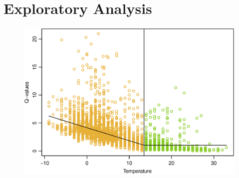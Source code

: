 \chapter{Exploratory Analysis}


\begin{figure}[H]
    \centering \includegraphics[width=1.\textwidth]{../../../figures/Consumption_H1.eps}
    \caption{}
    \label{fig: }
    \end{figure}
